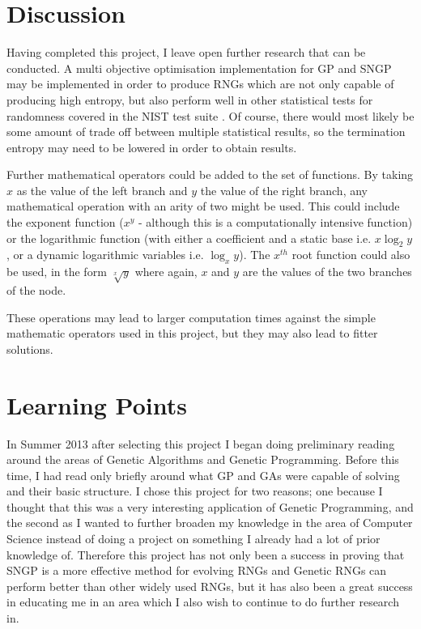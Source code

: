 \documentclass[a4paper,10.5pt]{article}
\begin{document}
\newpage

\section{Discussion}
\label{discussion}
Having completed this project, I leave open further research that can be conducted. A multi objective optimisation implementation for GP and SNGP may be implemented in order to produce RNGs which are not only capable of producing high entropy, but also perform well in other statistical tests for randomness covered in the NIST test suite \cite{nist}. Of course, there would most likely be some amount of trade off between multiple statistical results, so the termination entropy may need to be lowered in order to obtain results. 

Further mathematical operators could be added to the set of functions. By taking $x$ as the value of the left branch and $y$ the value of the right branch, any mathematical operation with an arity of two might be used. This could include the exponent function ($x^y$ - although this is a computationally intensive function) or the logarithmic function (with either a coefficient and a static base i.e. $x \log_2 y$, or a dynamic logarithmic variables i.e. $\log_x y$). The $x^{th}$ root function could also be used, in the form $\sqrt[x]{y}$ where again, $x$ and $y$ are the values of the two branches of the node.

These operations may lead to larger computation times against the simple mathematic operators used in this project, but they may also lead to fitter solutions.

\section{Learning Points}
In Summer 2013 after selecting this project I began doing preliminary reading around the areas of Genetic Algorithms and Genetic Programming. Before this time, I had read only briefly around what GP and GAs were capable of solving and their basic structure. I chose this project for two reasons; one because I thought that this was a very interesting application of Genetic Programming, and the second as I wanted to further broaden my knowledge in the area of Computer Science instead of doing a project on something I already had a lot of prior knowledge of. Therefore this project has not only been a success in proving that SNGP is a more effective method for evolving RNGs and Genetic RNGs can perform better than other widely used RNGs, but it has also been a great success in educating me in an area which I also wish to continue to do further research in.
\end{document}
